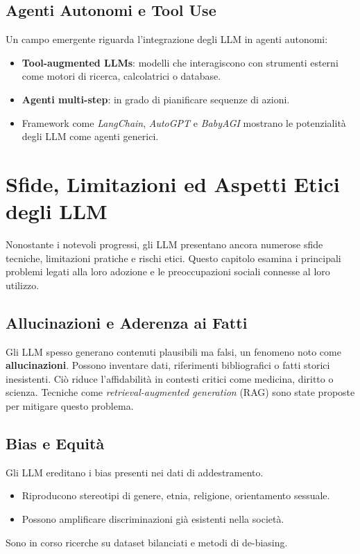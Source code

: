 \subsection{Agenti Autonomi e Tool Use}
Un campo emergente riguarda l'integrazione degli LLM in agenti autonomi:
\begin{itemize}
    \item \textbf{Tool-augmented LLMs}: modelli che interagiscono con strumenti esterni 
    come motori di ricerca, calcolatrici o database.
    \item \textbf{Agenti multi-step}: in grado di pianificare sequenze di azioni.
    \item Framework come \textit{LangChain}, \textit{AutoGPT} e \textit{BabyAGI} mostrano 
    le potenzialità degli LLM come agenti generici.
\end{itemize}

\newpage
\section{Sfide, Limitazioni ed Aspetti Etici degli LLM}

Nonostante i notevoli progressi, gli LLM presentano ancora 
numerose sfide tecniche, limitazioni pratiche e rischi etici. 
Questo capitolo esamina i principali problemi legati alla loro adozione 
e le preoccupazioni sociali connesse al loro utilizzo.

\subsection{Allucinazioni e Aderenza ai Fatti}
Gli LLM spesso generano contenuti plausibili ma falsi, un fenomeno noto come \textbf{allucinazioni}.
Possono inventare dati, riferimenti bibliografici o fatti storici inesistenti. Ciò riduce l'affidabilità in contesti critici 
come medicina, diritto o scienza. Tecniche come \textit{\textit{retrieval-augmented generation}} (RAG) sono state proposte per mitigare questo problema.

\subsection{Bias e Equità}
Gli LLM ereditano i bias presenti nei dati di addestramento.
\begin{itemize}
    \item Riproducono stereotipi di genere, etnia, religione, orientamento sessuale.
    \item Possono amplificare discriminazioni già esistenti nella società.
\end{itemize}
Sono in corso ricerche su dataset bilanciati e metodi di de-biasing.

